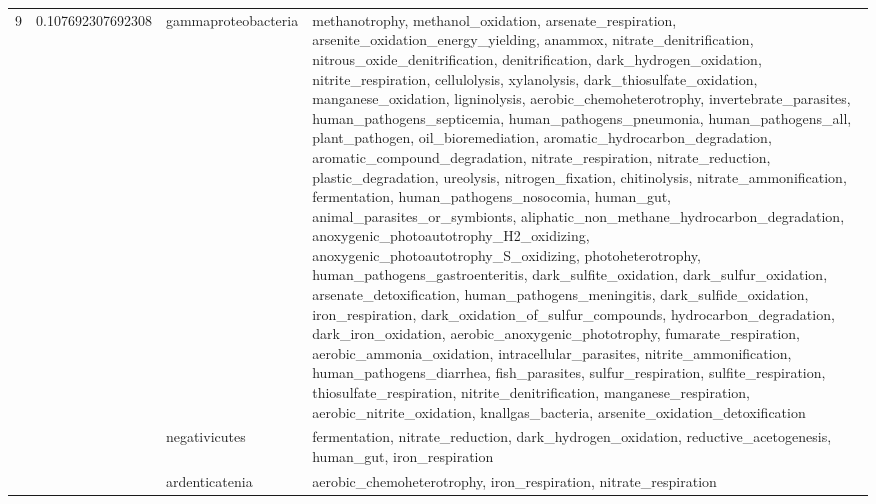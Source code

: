 \documentclass{article}
\begin{document}
\begin{longtable}{|l|c|l|>{\raggedright\arraybackslash}p{6cm}|}
9 & 0.107692307692308 & gammaproteobacteria & methanotrophy, methanol\_oxidation, arsenate\_respiration, arsenite\_oxidation\_energy\_yielding, anammox, nitrate\_denitrification, nitrous\_oxide\_denitrification, denitrification, dark\_hydrogen\_oxidation, nitrite\_respiration, cellulolysis, xylanolysis, dark\_thiosulfate\_oxidation, manganese\_oxidation, ligninolysis, aerobic\_chemoheterotrophy, invertebrate\_parasites, human\_pathogens\_septicemia, human\_pathogens\_pneumonia, human\_pathogens\_all, plant\_pathogen, oil\_bioremediation, aromatic\_hydrocarbon\_degradation, aromatic\_compound\_degradation, nitrate\_respiration, nitrate\_reduction, plastic\_degradation, ureolysis, nitrogen\_fixation, chitinolysis, nitrate\_ammonification, fermentation, human\_pathogens\_nosocomia, human\_gut, animal\_parasites\_or\_symbionts, aliphatic\_non\_methane\_hydrocarbon\_degradation, anoxygenic\_photoautotrophy\_H2\_oxidizing, anoxygenic\_photoautotrophy\_S\_oxidizing, photoheterotrophy, human\_pathogens\_gastroenteritis, dark\_sulfite\_oxidation, dark\_sulfur\_oxidation, arsenate\_detoxification, human\_pathogens\_meningitis, dark\_sulfide\_oxidation, iron\_respiration, dark\_oxidation\_of\_sulfur\_compounds, hydrocarbon\_degradation, dark\_iron\_oxidation, aerobic\_anoxygenic\_phototrophy, fumarate\_respiration, aerobic\_ammonia\_oxidation, intracellular\_parasites, nitrite\_ammonification, human\_pathogens\_diarrhea, fish\_parasites, sulfur\_respiration, sulfite\_respiration, thiosulfate\_respiration, nitrite\_denitrification, manganese\_respiration, aerobic\_nitrite\_oxidation, knallgas\_bacteria, arsenite\_oxidation\_detoxification\\
\cline{3-4}
 &  & negativicutes & fermentation, nitrate\_reduction, dark\_hydrogen\_oxidation, reductive\_acetogenesis, human\_gut, iron\_respiration\\
\cline{3-4}
 &  & ardenticatenia & aerobic\_chemoheterotrophy, iron\_respiration, nitrate\_respiration\\
\hline

\end{longtable}
\end{document}
